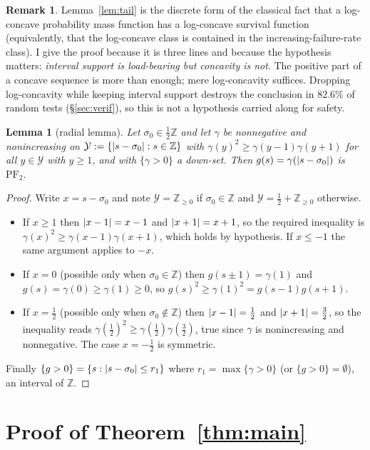 \documentclass[11pt]{article}
\newtheorem{lemma}[theorem]{Lemma}
\theoremstyle{definition}
\newtheorem{remark}[theorem]{Remark}
\newcommand{\Z}{\mathbb Z}
\newcommand{\PFtwo}{\mathrm{PF}_2}
\newcommand{\Ylat}{\mathcal Y}
\DeclarePairedDelimiter{\abs}{\lvert}{\rvert}
\begin{document}
\begin{remark}
Lemma~\ref{lem:tail} is the discrete form of the classical fact that a log-concave
probability mass function has a log-concave survival function (equivalently, that the
log-concave class is contained in the increasing-failure-rate class). I give the proof
because it is three lines and because the hypothesis matters: \emph{interval support is
load-bearing but concavity is not}. The positive part of a concave sequence is more than
enough; mere log-concavity suffices. Dropping log-concavity while keeping interval support
destroys the conclusion in $82.6\%$ of random tests (§\ref{sec:verif}), so this is not a
hypothesis carried along for safety.
\end{remark}

\begin{lemma}[radial lemma]\label{lem:radialLC}
Let $\sigma_0\in\tfrac12\Z$ and let $\gamma$ be nonnegative and nonincreasing on
$\Ylat:=\{\abs{s-\sigma_0}:s\in\Z\}$ with $\gamma(y)^2\ge\gamma(y-1)\gamma(y+1)$ for all
$y\in\Ylat$ with $y\ge1$, and with $\{\gamma>0\}$ a down-set. Then
$g(s)=\gamma(\abs{s-\sigma_0})$ is $\PFtwo$.
\end{lemma}
\begin{proof}
Write $x=s-\sigma_0$ and note $\Ylat=\Z_{\ge0}$ if $\sigma_0\in\Z$ and
$\Ylat=\tfrac12+\Z_{\ge0}$ otherwise.
\begin{itemize}
\item If $x\ge1$ then $\abs{x-1}=x-1$ and $\abs{x+1}=x+1$, so the required inequality is
$\gamma(x)^2\ge\gamma(x-1)\gamma(x+1)$, which holds by hypothesis. If $x\le-1$ the same
argument applies to $-x$.
\item If $x=0$ (possible only when $\sigma_0\in\Z$) then $g(s\pm1)=\gamma(1)$ and
$g(s)=\gamma(0)\ge\gamma(1)\ge0$, so $g(s)^2\ge\gamma(1)^2=g(s-1)g(s+1)$.
\item If $x=\tfrac12$ (possible only when $\sigma_0\notin\Z$) then $\abs{x-1}=\tfrac12$ and
$\abs{x+1}=\tfrac32$, so the inequality reads
$\gamma(\tfrac12)^2\ge\gamma(\tfrac12)\gamma(\tfrac32)$, true since $\gamma$ is
nonincreasing and nonnegative. The case $x=-\tfrac12$ is symmetric.
\end{itemize}
Finally $\{g>0\}=\{s:\abs{s-\sigma_0}\le r_1\}$ where $r_1=\max\{\gamma>0\}$ (or
$\{g>0\}=\emptyset$), an interval of $\Z$.
\end{proof}

\section{Proof of Theorem~\ref{thm:main}}\label{sec:main}
\end{document}
